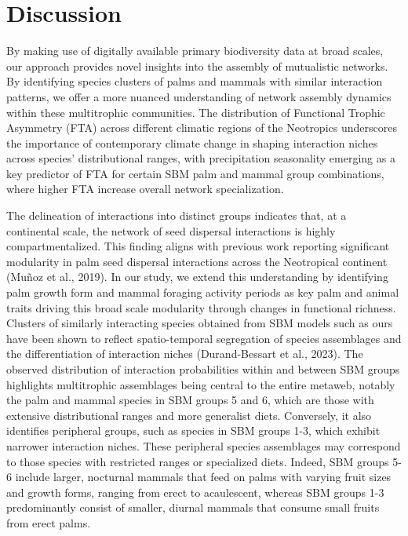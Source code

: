 \documentclass[
]{agujournal2019}
\begin{document}
\section{Discussion}\label{discussion}

By making use of digitally available primary biodiversity data at broad
scales, our approach provides novel insights into the assembly of
mutualistic networks. By identifying species clusters of palms and
mammals with similar interaction patterns, we offer a more nuanced
understanding of network assembly dynamics within these multitrophic
communities. The distribution of Functional Trophic Asymmetry (FTA)
across different climatic regions of the Neotropics underscores the
importance of contemporary climate change in shaping interaction niches
across species' distributional ranges, with precipitation seasonality
emerging as a key predictor of FTA for certain SBM palm and mammal group
combinations, where higher FTA increase overall network specialization.

The delineation of interactions into distinct groups indicates that, at
a continental scale, the network of seed dispersal interactions is
highly compartmentalized. This finding aligns with previous work
reporting significant modularity in palm seed dispersal interactions
across the Neotropical continent (Muñoz et al., 2019). In our study, we
extend this understanding by identifying palm growth form and mammal
foraging activity periods as key palm and animal traits driving this
broad scale modularity through changes in functional richness. Clusters
of similarly interacting species obtained from SBM models such as ours
have been shown to reflect spatio-temporal segregation of species
assemblages and the differentiation of interaction niches
(Durand-Bessart et al., 2023). The observed distribution of interaction
probabilities within and between SBM groups highlights multitrophic
assemblages being central to the entire metaweb, notably the palm and
mammal species in SBM groups 5 and 6, which are those with extensive
distributional ranges and more generalist diets. Conversely, it also
identifies peripheral groups, such as species in SBM groups 1-3, which
exhibit narrower interaction niches. These peripheral species
assemblages may correspond to those species with restricted ranges or
specialized diets. Indeed, SBM groups 5-6 include larger, nocturnal
mammals that feed on palms with varying fruit sizes and growth forms,
ranging from erect to acaulescent, whereas SBM groups 1-3 predominantly
consist of smaller, diurnal mammals that consume small fruits from erect
palms.
\end{document}
